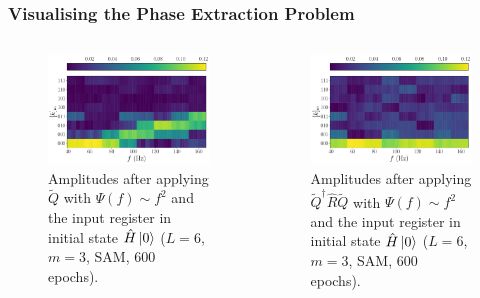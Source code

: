\documentclass{beamer}
\begin{document}
\begin{frame}
\frametitle{Visualising the Phase Extraction Problem}
\begin{columns}
\begin{column}{0.5\textwidth}
\begin{figure}
\centering 
\includegraphics[width=\textwidth]{im/Q_amp_quadratic_H}
\caption{Amplitudes after applying $\tilde{Q}$ with $\Psi(f) \sim f^2$ and the input register in initial state $\hat{H} \ket{0}$ ($L=6$, $m=3$, SAM, 600 epochs). }
\end{figure}
\end{column}
\begin{column}{0.5\textwidth}
\begin{figure}
\centering 
\includegraphics[width=\textwidth]{im/QRQ_amp_quadratic_H}
\caption{Amplitudes after applying $\tilde{Q}^\dagger \hat{R} \tilde{Q}$ with $\Psi(f) \sim f^2$ and the input register in initial state $\hat{H} \ket{0}$ ($L=6$, $m=3$, SAM, 600 epochs). }
\end{figure}
\end{column}
\end{columns}
\end{frame}
\end{document}
